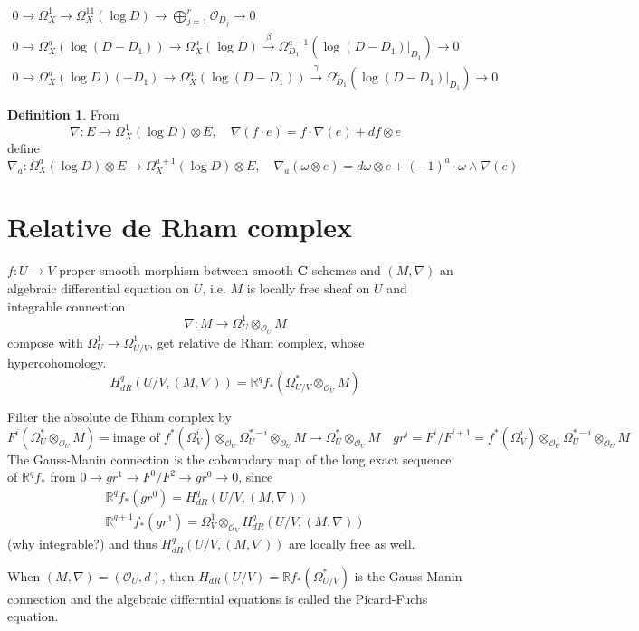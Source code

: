 \documentclass[leqno]{amsart}
\newcommand{\C}{\mathbf C}
\newcommand{\1}{\mathbf{1}}
\theoremstyle{definition}
\newtheorem{defn}[thm]{Definition}
\theoremstyle{remark}
\begin{document}
\begin{gather*}
	0\to \Omega_X^1\to \Omega_X^11(\log D)\to 
	\bigoplus_{j=1}^r\mathcal{O}_{D_j}\to 0\\
	0\to \Omega_X^a(\log(D-D_1))\to 
	\Omega_X^a(\log D)\xrightarrow{\beta}
	\Omega_{D_1}^{a-1}(\log(D-D_1)\vert_{D_1})\to 0\\
	0\to \Omega_X^a(\log D)(-D_1)\to
	\Omega_X^a(\log(D-D_1))\xrightarrow{\gamma}
	\Omega_{D_1}^a(\log(D-D_1)\vert_{D_1})\to 0
\end{gather*}

\begin{defn}
	From 
	\[
		\nabla\colon E\to \Omega_X^1(\log D)\otimes E,\quad
		\nabla(f\cdot e)=f\cdot \nabla(e)+df\otimes e
	\]
	define 
	\[
		\nabla_a\colon \Omega_X^a(\log D)\otimes E
		\to \Omega_X^{a+1}(\log D)\otimes E,\quad
		\nabla_a(\omega\otimes e)=d\omega\otimes e+
		(-1)^a\cdot \omega\wedge\nabla(e)
	\]
\end{defn}

\section{Relative de Rham complex}
$f\colon U\to V$ proper smooth morphism between
smooth  $\C$-schemes
and  $(M,\nabla)$ an algebraic differential equation on  $U$,
i.e. $M$ is locally free sheaf on  $U$ and integrable connection
 \[
	 \nabla\colon M\to \Omega_U^1\otimes_{\mathcal{O}_U}M
\]
compose with $\Omega_U^1\to \Omega_{U/V}^1$,
get relative de Rham complex, whose hypercohomology.
\[
	H^q_{dR}(U/V,(M,\nabla))=
	\mathbb{R}^qf_*(\Omega_{U/V}^*\otimes_{\mathcal{O}_U}M)
\]

Filter the absolute de Rham complex by
\[
	F^i(\Omega_U^*\otimes_{\mathcal{O}_U}M)=
	\text{image of }
	f^*(\Omega_V^i)\otimes_{\mathcal{O}_U}
	\Omega_U^{*-i}\otimes_{\mathcal{O}_U}M
	\to \Omega_U^*\otimes_{\mathcal{O}_U}M\quad
	gr^i=F^i/F^{i+1}=
	f^*(\Omega_V^i)\otimes_{\mathcal{O}_U}
	\Omega_U^{*-i}\otimes_{\mathcal{O}_U}M
\]
The Gauss-Manin connection is the coboundary map of the 
long exact sequence of $\mathbb{R}^qf_*$
from 
 $0\to gr^1\to F^0/F^2\to gr^0\to 0$, since
  \begin{gather*}
	  \mathbb{R}^qf_*(gr^0)=H^q_{dR}(U/V,(M,\nabla))\\
	  \mathbb{R}^{q+1}f_*(gr^1)=
	  \Omega_V^1\otimes_{\mathcal{O}_V}H^q_{dR}(U/V,(M,\nabla))
 \end{gather*}
 (why integrable?)
 and thus $H^q_{dR}(U/V,(M,\nabla))$
 are locally free as well.

 When $(M,\nabla)=(\mathcal{O}_U,d)$,
 then  $H_{dR}(U/V)=\mathbb{R}f_*(\Omega_{U/V}^*)$
 is the Gauss-Manin connection
 and the algebraic differntial equations is called
 the Picard-Fuchs equation.
\end{document}
